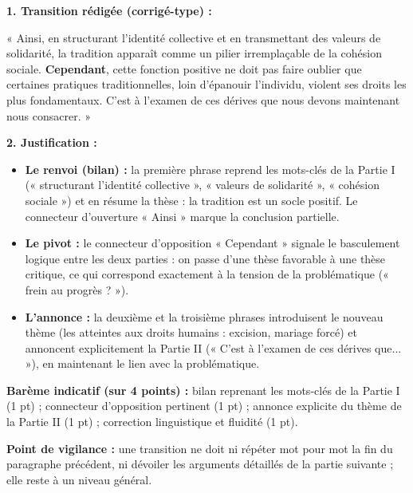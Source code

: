 \documentclass[11pt]{article}
\begin{document}
\begin{corrige}
\textbf{1. Transition rédigée (corrigé-type) :}

« Ainsi, en structurant l'identité collective et en transmettant des valeurs de solidarité, la tradition apparaît comme un pilier irremplaçable de la cohésion sociale. \textbf{Cependant}, cette fonction positive ne doit pas faire oublier que certaines pratiques traditionnelles, loin d'épanouir l'individu, violent ses droits les plus fondamentaux. C'est à l'examen de ces dérives que nous devons maintenant nous consacrer. »

\textbf{2. Justification :}
\begin{itemize}
\item \textbf{Le renvoi (bilan) :} la première phrase reprend les mots-clés de la Partie I (« structurant l'identité collective », « valeurs de solidarité », « cohésion sociale ») et en résume la thèse : la tradition est un socle positif. Le connecteur d'ouverture « Ainsi » marque la conclusion partielle.
\item \textbf{Le pivot :} le connecteur d'opposition « Cependant » signale le basculement logique entre les deux parties : on passe d'une thèse favorable à une thèse critique, ce qui correspond exactement à la tension de la problématique (« frein au progrès ? »).
\item \textbf{L'annonce :} la deuxième et la troisième phrases introduisent le nouveau thème (les atteintes aux droits humains : excision, mariage forcé) et annoncent explicitement la Partie II (« C'est à l'examen de ces dérives que... »), en maintenant le lien avec la problématique.
\end{itemize}
\textbf{Barème indicatif (sur 4 points) :} bilan reprenant les mots-clés de la Partie I (1 pt) ; connecteur d'opposition pertinent (1 pt) ; annonce explicite du thème de la Partie II (1 pt) ; correction linguistique et fluidité (1 pt).

\textbf{Point de vigilance :} une transition ne doit ni répéter mot pour mot la fin du paragraphe précédent, ni dévoiler les arguments détaillés de la partie suivante ; elle reste à un niveau général.
\end{corrige}
\end{document}
